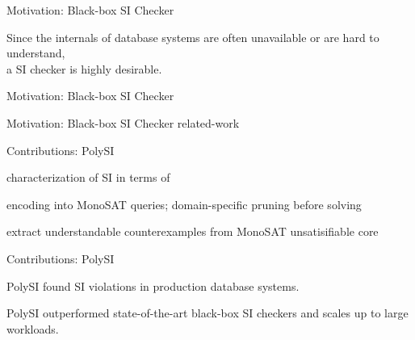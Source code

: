 \begin{frame}{Motivation: Black-box SI Checker}
  \begin{center}
    Since the internals of database systems are often unavailable
    or are hard to understand, \\[6pt]
    a  SI checker is highly desirable.
  \end{center}
\end{frame}

\begin{frame}{Motivation: Black-box SI Checker}
  \begin{center}
    

    \vspace{0.30cm}
  \end{center}
\end{frame}

\begin{frame}{Motivation: Black-box SI Checker}
  related-work
\end{frame}

\begin{frame}{Contributions: PolySI}
  \begin{description}
    \setlength{\itemsep}{6pt}
    \item[Sound \& Complete:] characterization of SI in terms of 
    \item[Efficient:] encoding into MonoSAT queries;
      domain-specific pruning before solving
    \item[Informative:] extract understandable counterexamples from MonoSAT unsatisifiable core
  \end{description}
\end{frame}

\begin{frame}{Contributions: PolySI}
  \begin{center}
    PolySI found SI violations in production database systems.

    \vspace{0.80cm}
    PolySI outperformed state-of-the-art black-box SI checkers
    and scales up to large workloads.
  \end{center}
\end{frame}
